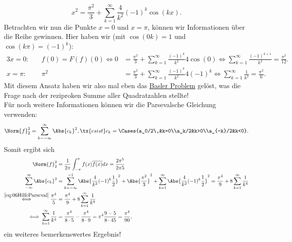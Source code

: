 \begin{Beispiel}
\begin{equation*}
    x^2=\frac{\pi^2}{3}+\sum_{k=1}^\infty \frac{4}{k^2}(-1)^k\cos(kx).
\end{equation*}
Betrachten wir nun die Punkte $x=0$ und $x=\pi$, können wir Informationen über die Reihe gewinnen. Hier haben wir (mit $\cos(0k)=1$ und $\cos(k\pi)=(-1)^k$):
\begin{alignat*}{3}
x=0:&\,&f(0)=F(f)(0)\iff 0&=\frac{\pi^2}{3}+\sum_{k=1}^\infty\frac{(-1)^k}{k^2}4\cos(0)\iff \sum_{k=1}^\infty\frac{(-1)^{k+1}}{k^2}=\frac{\pi^2}{12}.\\
x=\pi:&&\pi^2&=\frac{\pi^2}{3}+\sum_{k=1}^\infty\frac{(-1)^k}{k^2}4(-1)^k\iff \sum_{k=1}^\infty\frac{1}{k^2}=\frac{\pi^2}{6}.
\end{alignat*}
Mit diesem Ansatz haben wir also mal eben das \href{https://de.wikipedia.org/wiki/Basler_Problem}{Basler Problem} gelöst, was die Frage nach der reziproken Summe aller Quadratzahlen stellte!\\
Für noch weitere Informationen können wir die Parsevalsche Gleichung verwenden:
\begin{equation*}\label{eq:06HilfeParseval}
    \Norm{f}_2^2=\sum_{k=-\infty}^\infty\Abs{c_k}^2,\tx{ es ist }c_k=\Cases{a_0/2\,&k=0\\a_k/2&k>0\\a_{-k}/2&k<0}.
\end{equation*}
Somit ergibt sich
\begin{align*}
    \Norm{f}_2^2&=\frac{1}{2\pi}\int_{-\pi}^\pi f(x)\overline{f(x)}dx=\frac{2\pi^5}{2\pi 5}\\
    \sum_{-\infty}^\infty \Abs{c_k}^2&=\sum_{k=-\infty}^{-1}\Abs{\frac{4}{k^2}(-1)^k\frac{1}{2}}^2+\Abs{\frac{\pi^2}{3}}^2+\sum_{k=1}^\infty\Abs{\frac{4}{k^2}(-1)^k\frac{1}{2}}^2=\frac{\pi^4}{9}+8\sum_{k=1}^\infty\frac{1}{k^4}\\
    \overset{\eqref{eq:06HilfeParseval}}{\iff}\frac{\pi^4}{5}&=\frac{\pi^4}{9}+8\sum_{k=1}^\infty\frac{1}{k^4}\\
    \iff\sum_{k=1}^\infty\frac{1}{k^4}&=\frac{\pi^4}{8\cdot 5}-\frac{\pi^4}{8\cdot9}=\pi^4\frac{9-5}{8\cdot 45}=\frac{\pi^4}{90},
\end{align*}
ein weiteres bemerkenswertes Ergebnis!
\end{Beispiel}
